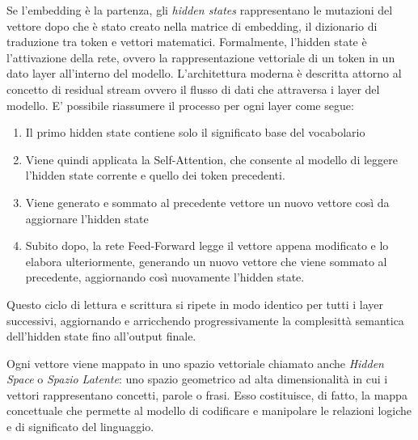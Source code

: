 Se l'embedding è la partenza, gli \textit{hidden states} rappresentano le mutazioni del vettore dopo che è stato creato nella matrice di embedding, il dizionario di traduzione tra token e vettori matematici.
Formalmente, l'hidden state è l'attivazione della rete, ovvero la rappresentazione vettoriale di un token in un dato layer all'interno del modello.
L'architettura moderna è descritta attorno al concetto di residual stream \cite{elhage2021mathematical} ovvero il flusso di dati che attraversa i layer del modello.
E' possibile riassumere il processo per ogni layer come segue:
\begin{enumerate}
    \item Il primo hidden state contiene solo il significato base del vocabolario
    \item Viene quindi applicata la Self-Attention, che consente al modello di leggere l'hidden state corrente e quello dei token precedenti.
    \item Viene generato e sommato al precedente vettore un nuovo vettore così da aggiornare l'hidden state
    \item Subito dopo, la rete Feed-Forward legge il vettore appena modificato e lo elabora ulteriormente, generando un nuovo vettore che viene sommato al precedente, aggiornando così nuovamente l'hidden state.
\end{enumerate}

Questo ciclo di lettura e scrittura si ripete in modo identico per tutti i layer successivi, aggiornando e arricchendo progressivamente la complesittà semantica dell'hidden state fino all'output finale.

Ogni vettore viene mappato in uno spazio vettoriale chiamato anche \textit{Hidden Space} o \textit{Spazio Latente}: uno spazio geometrico ad alta dimensionalità in cui i vettori rappresentano concetti, parole o frasi. Esso costituisce, di fatto, la mappa concettuale che permette al modello di codificare e manipolare le relazioni logiche e di significato del linguaggio.
